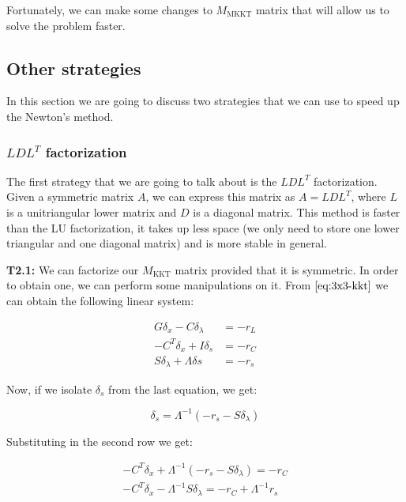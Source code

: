 \documentclass[11pt,a4paper]{article}
\begin{document}
Fortunately, we can make some changes to $M_{\text{MKKT}}$ matrix that will allow us to
solve the problem faster.

\subsection{Other strategies}

In this section we are going to discuss two strategies that we can use to speed up
the Newton's method.

\subsubsection{$LDL^T$ factorization}

The first strategy that we are going to talk about is the $LDL^T$ factorization. Given a symmetric
matrix $A$, we can express this matrix as $A = LDL^T$, where $L$ is a unitriangular lower matrix and
$D$ is a diagonal matrix. This method is faster than the LU factorization, it takes up less space (we
only need to store one lower triangular and one diagonal matrix) and is more stable in general.

\noindent \textbf{T2.1:} We can factorize our $M_{\text{KKT}}$ matrix provided that it is symmetric. In order to obtain one, we
can perform some manipulations on it. From $\eqref{eq:3x3-kkt}$ we can obtain the following linear system:

\begin{equation}
  \begin{aligned}
    G\delta_x - C\delta_{\lambda} &= -r_L \\
    -C^T\delta_x + I\delta_s &= -r_C \\
    S\delta_{\lambda} + \Lambda \delta s &= -r_s
  \end{aligned}
\end{equation}

Now, if we isolate $\delta_s$ from the last equation, we get:

\[
  \delta_s = \Lambda^{-1}(-r_s - S\delta_{\lambda})
\]

Substituting in the second row we get:

\begin{equation*}
  \begin{aligned}
    -C^T \delta_x + \Lambda^{-1}(-r_s - S\delta_{\lambda}) = -r_C \\
    -C^T \delta_x - \Lambda^{-1}S\delta_{\lambda} = -r_C + \Lambda^{-1}r_s
  \end{aligned}
\end{equation*}
\end{document}
